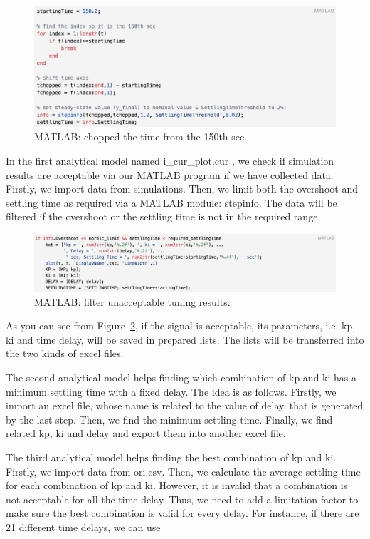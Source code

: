 \begin{figure}[htbp]
\centering
\includegraphics[width = .999\textwidth]{figure/3_4_2_chopped.png}
\caption{MATLAB: chopped the time from the 150th sec.}
\label{3_4_2_chopped}
\end{figure}


In the first analytical model named i\_cur\_plot.cur , we check if simulation results are acceptable via our MATLAB program if we have collected data. Firstly, we import data from simulations. Then, we limit both the overshoot and settling time as required via a MATLAB module: stepinfo. The data will be filtered if the overshoot or the settling time is not in the required range. 

\begin{figure}[htbp]
\centering
\includegraphics[width = .999\textwidth]{figure/3_4_2_code5.png}
\caption{MATLAB: filter unacceptable tuning results.}
\label{3_4_2_code5}
\end{figure}


As you can see from Figure~\ref{3_4_2_code5}, if the signal is acceptable, its parameters, i.e. kp, ki and time delay, will be saved in prepared lists. The lists will be transferred into the two kinds of excel files. 

The second analytical model helps finding which combination of kp and ki has a minimum settling time with a fixed delay. The idea is as follows. Firstly, we import an excel file, whose name is related to the value of delay,  that is generated by the last step. Then, we find the minimum settling time. Finally, we find related kp, ki and delay and export them into another excel file. 

The third analytical model helps finding the best combination of kp and ki. Firstly, we import data from ori.csv. Then, we calculate the average settling time for each combination of kp and ki. However, it is invalid that a combination is not acceptable for all the time delay. Thus, we need to add a limitation factor to make sure the best combination is valid for every delay. For instance, if there are 21 different time delays, we can use 

